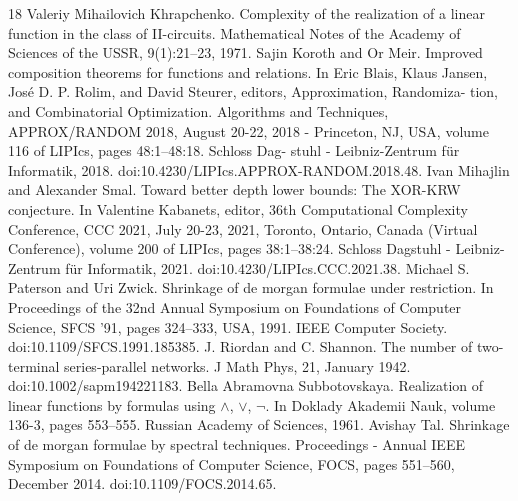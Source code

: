 \begin{thebibliography}{18}
 Valeriy Mihailovich Khrapchenko. Complexity of the realization of a linear function in the class of II-circuits. Mathematical Notes of the Academy of Sciences of the USSR, 9(1):21–23, 1971.
 Sajin Koroth and Or Meir. Improved composition theorems for functions and relations. In Eric Blais, Klaus Jansen, José D. P. Rolim, and David Steurer, editors, Approximation, Randomiza- tion, and Combinatorial Optimization. Algorithms and Techniques, APPROX/RANDOM 2018, August 20-22, 2018 - Princeton, NJ, USA, volume 116 of LIPIcs, pages 48:1–48:18. Schloss Dag- stuhl - Leibniz-Zentrum für Informatik, 2018. doi:10.4230/LIPIcs.APPROX-RANDOM.2018.48.
 Ivan Mihajlin and Alexander Smal. Toward better depth lower bounds: The XOR-KRW conjecture. In Valentine Kabanets, editor, 36th Computational Complexity Conference, CCC 2021, July 20-23, 2021, Toronto, Ontario, Canada (Virtual Conference), volume 200 of LIPIcs, pages 38:1–38:24. Schloss Dagstuhl - Leibniz-Zentrum für Informatik, 2021. doi:10.4230/LIPIcs.CCC.2021.38.
 Michael S. Paterson and Uri Zwick. Shrinkage of de morgan formulae under restriction. In Proceedings of the 32nd Annual Symposium on Foundations of Computer Science, SFCS ’91, pages 324–333, USA, 1991. IEEE Computer Society. doi:10.1109/SFCS.1991.185385.
 J. Riordan and C. Shannon. The number of two-terminal series-parallel networks. J Math Phys, 21, January 1942. doi:10.1002/sapm194221183.
 Bella Abramovna Subbotovskaya. Realization of linear functions by formulas using $\wedge$, $\vee$, $\neg$. In Doklady Akademii Nauk, volume 136-3, pages 553–555. Russian Academy of Sciences, 1961.
 Avishay Tal. Shrinkage of de morgan formulae by spectral techniques. Proceedings - Annual IEEE Symposium on Foundations of Computer Science, FOCS, pages 551–560, December 2014. doi:10.1109/FOCS.2014.65.
\end{thebibliography}
